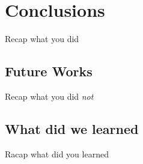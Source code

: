 \section{Conclusions}

Recap what you did

\subsection{Future Works}

Recap what you did \emph{not}

\subsection{What did we learned}

Racap what did you learned

